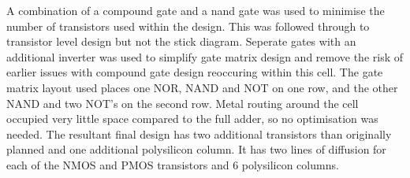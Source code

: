 


A combination of a compound gate and a nand gate was used to minimise the number of transistors used within the design.
This was followed through to transistor level design but not the stick diagram. 
Seperate gates with an additional inverter was used to simplify gate matrix design and remove the risk of earlier issues with compound gate design reoccuring within this cell.
The gate matrix layout used places one NOR, NAND and NOT on one row, and the other NAND and two NOT's on the second row. 
Metal routing around the cell occupied very little space compared to the full adder, so no optimisation was needed.
The resultant final design has two additional transistors than originally planned and one additional polysilicon column. 
It has two lines of diffusion for each of the NMOS and PMOS transistors and 6 polysilicon columns. 


